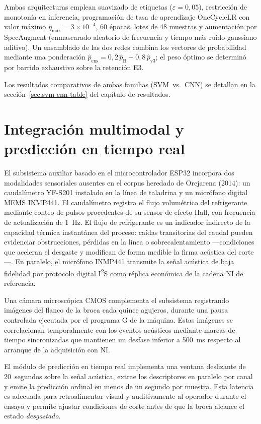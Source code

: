 \documentclass[12pt, letterpaper]{report}
\begin{document}
Ambas arquitecturas emplean suavizado de etiquetas ($\varepsilon =
0{,}05$), restricción de monotonía en inferencia, programación de tasa
de aprendizaje OneCycleLR con valor máximo $\eta_{\max}=3\times10^{-4}$,
60 épocas, lotes de 48 muestras y aumentación por SpecAugment
(enmascarado aleatorio de frecuencia y tiempo más ruido gaussiano
aditivo). Un ensamblado de las dos redes combina los vectores de
probabilidad mediante una ponderación $\hat{p}_{\text{ens}} =
0{,}2\,\hat{p}_{\text{B}} + 0{,}8\,\hat{p}_{\text{v3}}$; el peso óptimo
se determinó por barrido exhaustivo sobre la retención E3.

Los resultados comparativos de ambas familias (SVM~vs.~CNN) se detallan
en la sección~\ref{sec:svm-cnn-table} del capítulo de resultados.

\section{Integración multimodal y predicción en tiempo real}
\label{sec:integracion-tr}

El subsistema auxiliar basado en el microcontrolador ESP32 incorpora
dos modalidades sensoriales ausentes en el corpus heredado de Orejarena
(2014): un caudalímetro YF-S201 instalado en la línea de taladrina y un
micrófono digital MEMS INMP441. El caudalímetro registra el flujo
volumétrico del refrigerante mediante conteo de pulsos procedentes de
su sensor de efecto Hall, con frecuencia de actualización de 1~Hz. El
flujo de refrigerante es un indicador indirecto de la capacidad térmica
instantánea del proceso: caídas transitorias del caudal pueden evidenciar
obstrucciones, pérdidas en la línea o sobrecalentamiento ---condiciones
que aceleran el desgaste y modifican de forma medible la firma acústica
del corte---. En paralelo, el micrófono INMP441 transmite la señal
acústica de baja fidelidad por protocolo digital I\textsuperscript{2}S
como réplica económica de la cadena NI de referencia.

Una cámara microscópica CMOS complementa el subsistema registrando
imágenes del flanco de la broca cada quince agujeros, durante una pausa
controlada ejecutada por el programa G de la máquina. Estas imágenes se
correlacionan temporalmente con los eventos acústicos mediante marcas
de tiempo sincronizadas que mantienen un desfase inferior a 500~ms
respecto al arranque de la adquisición con NI.

El módulo de predicción en tiempo real implementa una ventana deslizante
de 20~segundos sobre la señal acústica, extrae los descriptores en
paralelo por canal y emite la predicción ordinal en menos de un segundo
por muestra. Esta latencia es adecuada para retroalimentar visual y
auditivamente al operador durante el ensayo y permite
ajustar condiciones de corte antes de que la broca alcance el estado
\emph{desgastado}.
\end{document}
